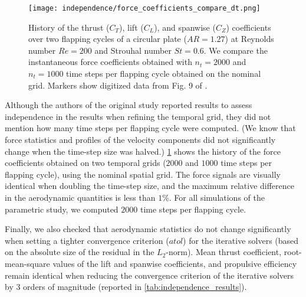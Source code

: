 \begin{figure}[!h]
  \centering
  \texttt{[image: independence/force\_coefficients\_compare\_dt.png]}
  \caption{History of the thrust ($C_T$), lift ($C_L$), and spanwise ($C_Z$) coefficients over two flapping cycles of a circular plate ($AR = 1.27$) at Reynolds number $Re = 200$ and Strouhal number $St = 0.6$. We compare the instantaneous force coefficients obtained with $n_t = 2000$ and $n_t = 1000$ time steps per flapping cycle obtained on the nominal grid. Markers show digitized data from Fig. 9 of \citet{li_dong_2016}.}
  \label{fig:independence_force_coefficients_dt}
\end{figure}

Although the authors of the original study reported results to assess independence in the results when refining the temporal grid, they did not mention how many time steps per flapping cycle were computed.
(We know that force statistics and profiles of the velocity components did not significantly change when the time-step size was halved.)
\cref{fig:independence_force_coefficients_dt} shows the history of the force coefficients obtained on two temporal grids ($2000$ and $1000$ time steps per flapping cycle), using the nominal spatial grid.
The force signals are visually identical when doubling the time-step size, and the maximum relative difference in the aerodynamic quantities is less than $1\%$.
For all simulations of the parametric study, we computed $2000$ time steps per flapping cycle.

Finally, we also checked that aerodynamic statistics do not change significantly when setting a tighter convergence criterion ($atol$) for the iterative solvers (based on the absolute size of the residual in the $L_2$-norm).
Mean thrust coefficient, root-mean-square values of the lift and spanwise coefficients, and propulsive efficiency remain identical when reducing the convergence criterion of the iterative solvers by 3 orders of magnitude (reported in \cref{tab:independence_results}).

